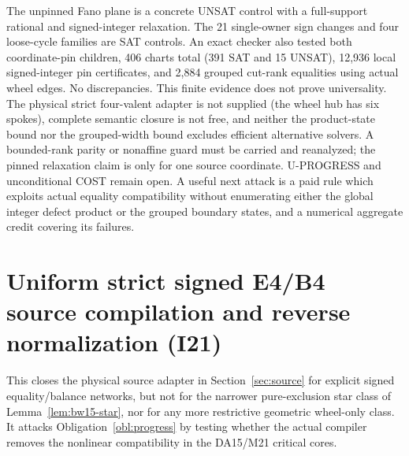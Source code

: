 \documentclass[11pt]{article}
\begin{document}
The unpinned Fano plane is a concrete UNSAT control with a full-support rational and signed-integer relaxation. The 21 single-owner sign changes and four loose-cycle families are SAT controls. An exact checker also tested both coordinate-pin children, 406 charts total (391 SAT and 15 UNSAT), 12,936 local signed-integer pin certificates, and 2,884 grouped cut-rank equalities using actual wheel edges. No discrepancies. This finite evidence does not prove universality. The physical strict four-valent adapter is not supplied (the wheel hub has six spokes), complete semantic closure is not free, and neither the product-state bound nor the grouped-width bound excludes efficient alternative solvers. A bounded-rank parity or nonaffine guard must be carried and reanalyzed; the pinned relaxation claim is only for one source coordinate. U-PROGRESS and unconditional COST remain open. A useful next attack is a paid rule which exploits actual equality compatibility without enumerating either the global integer defect product or the grouped boundary states, and a numerical aggregate credit covering its failures.

\section{Uniform strict signed E4/B4 source compilation and reverse normalization (I21)}\label{sec:i21}
This closes the physical source adapter in Section~\ref{sec:source} for explicit signed equality/balance networks, but not for the narrower pure-exclusion star class of Lemma~\ref{lem:bw15-star}, nor for any more restrictive geometric wheel-only class. It attacks Obligation~\ref{obl:progress} by testing whether the actual compiler removes the nonlinear compatibility in the DA15/M21 critical cores.
\end{document}
